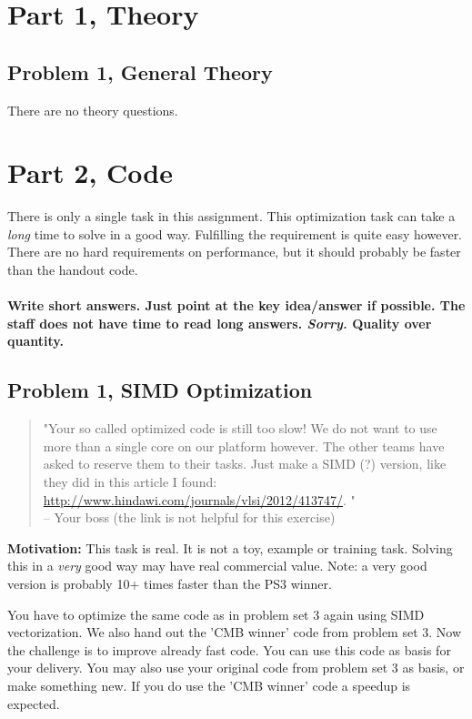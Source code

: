 \documentclass[10pt,a4paper]{article}
\begin{document}
\section*{Part 1, Theory}

\subsection*{Problem 1, General Theory}
There are no theory questions.



\section*{Part 2, Code}
There is only a single task in this assignment. This optimization task can take a \emph{long} time to solve in a good way. Fulfilling the requirement is quite easy however. There are no hard requirements on performance, but it should probably be faster than the handout code.
\\
\\
\textbf{ Write short answers. Just point at the key idea/answer if possible. The staff does not have time to read long answers. \emph{Sorry.} Quality over quantity.}


\subsection*{Problem 1, SIMD Optimization}
\begin{quotation}
"Your so called optimized code is still too slow! We do not want to use more than a single core on our platform however. The other teams have asked to reserve them to their tasks. Just make a SIMD (?) version, like they did in this article I found: \url{http://www.hindawi.com/journals/vlsi/2012/413747/}. %
" \\-- Your boss (the link is not helpful for this exercise)
\end{quotation}
\textbf{Motivation:} This task is real. It is not a toy, example or training task. Solving this in a \emph{very} good way may have real commercial value. Note: a very good version is probably 10+ times faster than the PS3 winner.

You have to optimize the same code as in problem set 3 again using SIMD vectorization. 
We also hand out the 'CMB winner' code from problem set 3. Now the challenge is to improve already fast code. You can use this code as basis for your delivery. You may also use your original code from problem set 3 as basis, or make something new. If you do use the 'CMB winner' code a speedup is expected.
\\
\end{document}
